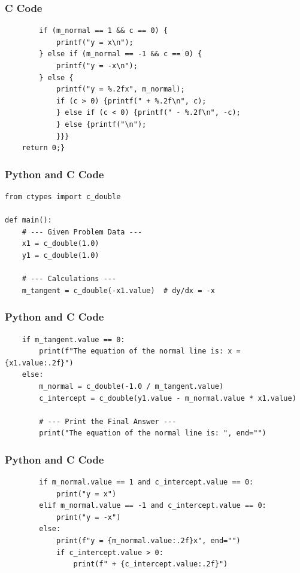 \documentclass{beamer}
\begin{document}
\begin{frame}[fragile]
\frametitle{C Code}
\begin{lstlisting}
        if (m_normal == 1 && c == 0) {
            printf("y = x\n");
        } else if (m_normal == -1 && c == 0) {
            printf("y = -x\n");
        } else {
            printf("y = %.2fx", m_normal);
            if (c > 0) {printf(" + %.2f\n", c);
            } else if (c < 0) {printf(" - %.2f\n", -c);
            } else {printf("\n");
            }}}
    return 0;}
\end{lstlisting}
\end{frame}

\begin{frame}[fragile]
\frametitle{Python and C Code}
\begin{lstlisting}
from ctypes import c_double

def main():
    # --- Given Problem Data ---
    x1 = c_double(1.0)
    y1 = c_double(1.0)

    # --- Calculations ---
    m_tangent = c_double(-x1.value)  # dy/dx = -x
\end{lstlisting}
\end{frame}

\begin{frame}[fragile]
\frametitle{Python and C Code}
\begin{lstlisting}
    if m_tangent.value == 0:
        print(f"The equation of the normal line is: x = {x1.value:.2f}")
    else:
        m_normal = c_double(-1.0 / m_tangent.value)
        c_intercept = c_double(y1.value - m_normal.value * x1.value)

        # --- Print the Final Answer ---
        print("The equation of the normal line is: ", end="")
\end{lstlisting}
\end{frame}

\begin{frame}[fragile]
\frametitle{Python and C Code}
\begin{lstlisting}
        if m_normal.value == 1 and c_intercept.value == 0:
            print("y = x")
        elif m_normal.value == -1 and c_intercept.value == 0:
            print("y = -x")
        else:
            print(f"y = {m_normal.value:.2f}x", end="")
            if c_intercept.value > 0:
                print(f" + {c_intercept.value:.2f}")
\end{lstlisting}
\end{frame}
\end{document}
